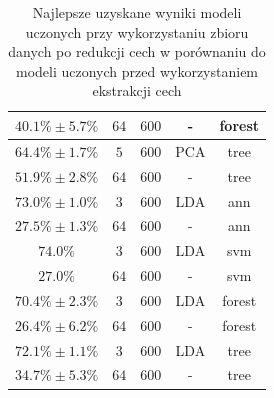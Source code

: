 \begin{table}
\begin{tabular}{|c|c|c|c|c|}
\hline
\rowcolor{Gray}
$40.1 \%\pm 5.7\%$ & $64$ & $ 600 $ & - & forest \\
\hline
\rowcolor{White}
$64.4 \%\pm 1.7\%$ & $5$ & $ 600 $ & PCA & tree \\
\hline
\rowcolor{White}
$51.9 \% \pm 2.8 \%$ & $64$ & $ 600 $ & - & tree \\
\hline
\rowcolor{Gray}
$73.0\%\pm 1.0\%$ & $3$ & $ 600 $ & LDA & ann \\
\hline
\rowcolor{Gray}
$27.5 \%\pm 1.3\%$ & $64$ & $ 600 $ & - & ann \\
\hline
\rowcolor{White}
$74.0\%$ & $3$ & $ 600 $ & LDA & svm \\
\hline
\rowcolor{White}
$27.0\%$ & $64$ & $ 600 $ & - & svm \\
\hline
\rowcolor{Gray}
$70.4 \%\pm 2.3\%$ & $3$ & $ 600 $ & LDA & forest \\
\hline
\rowcolor{Gray}
$26.4 \%\pm 6.2\%$ & $64$ & $ 600 $ & - & forest \\
\hline
\rowcolor{White}
$72.1 \%\pm 1.1\%$ & $3$ & $ 600 $ & LDA & tree \\
\hline
\rowcolor{White}
$34.7 \%\pm 5.3\%$ & $64$ & $ 600 $ & - & tree \\
\hline

 \end{tabular}
 \caption{Najlepsze uzyskane wyniki modeli uczonych przy wykorzystaniu zbioru danych po redukcji cech w porównaniu do modeli uczonych przed wykorzystaniem ekstrakcji cech} \label{table:bestFE}
\end{table}


